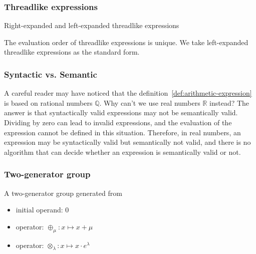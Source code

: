 \documentclass[aspectratio=169]{beamer}
\begin{document}
\begin{frame}
    \frametitle{Threadlike expressions}
    Right-expanded and left-expanded threadlike expressions
    \begin{figure}[ht]
        \centering
    \end{figure}
    The evaluation order of threadlike expressions is unique. We take left-expanded threadlike expressions as the standard form.
\end{frame}

\begin{frame}
    \frametitle{Syntactic vs. Semantic}
    A careful reader may have noticed that the definition~\ref{def:arithmetic-expression} is based on rational numbers $\mathbb{Q}$.
    Why can't we use real numbers $\mathbb{R}$ instead?
    The answer is that syntactically valid expressions may not be semantically valid.
    Dividing by zero can lead to invalid expressions, and the evaluation of the expression cannot be defined in this situation.
    Therefore, in real numbers, an expression may be syntactically valid but semantically not valid,
    and there is no algorithm that can decide whether an expression is semantically valid or not.
\end{frame}

\begin{frame}
    \frametitle{Two-generator group}
    A two-generator group generated from
    \begin{itemize}
        \item initial operand: $0$
        \item operator: $\oplus_\mu: x \mapsto x + \mu$
        \item operator: $\otimes_\lambda: x \mapsto x \cdot e^\lambda$
    \end{itemize}
\end{frame}
\end{document}
